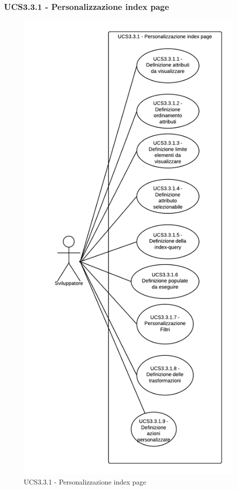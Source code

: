 \subsubsection{UCS3.3.1 - Personalizzazione index page} 
    \begin{figure}[H]
      \begin{center}
      \includegraphics[scale=0.16]{UML/UCS3.3.1 - Personalizzazione index page.png}
      \caption{UCS3.3.1 - Personalizzazione index page}
      \end{center} 
    \end{figure}  
    
